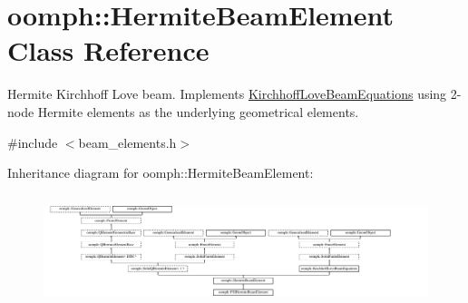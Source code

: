 \hypertarget{classoomph_1_1HermiteBeamElement}{}\section{oomph\+:\+:Hermite\+Beam\+Element Class Reference}
\label{classoomph_1_1HermiteBeamElement}


Hermite Kirchhoff Love beam. Implements \hyperlink{classoomph_1_1KirchhoffLoveBeamEquations}{Kirchhoff\+Love\+Beam\+Equations} using 2-\/node Hermite elements as the underlying geometrical elements.  




{\ttfamily \#include $<$beam\+\_\+elements.\+h$>$}

Inheritance diagram for oomph\+:\+:Hermite\+Beam\+Element\+:\begin{figure}[H]
\begin{center}
\leavevmode
\includegraphics[height=3.274854cm]{classoomph_1_1HermiteBeamElement}
\end{center}
\end{figure}
